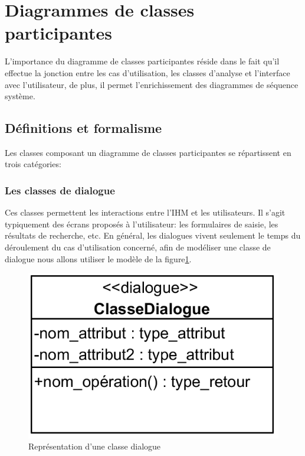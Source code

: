 \section{Diagrammes de classes participantes}
L’importance du diagramme de classes participantes réside dans le fait qu’il
effectue la jonction entre les cas d’utilisation, les classes d’analyse et
l’interface avec l’utilisateur, de plus, il permet l’enrichissement des
diagrammes de séquence système.\cite{8}

\subsection{Définitions et formalisme}
Les classes composant un diagramme de classes participantes se répartissent en
trois catégories:\cite{6}

\subsubsection{Les classes de dialogue}
Ces classes permettent les interactions entre l’IHM et les utilisateurs. 
Il s’agit typiquement des écrans proposés à l’utilisateur: les formulaires de 
saisie, les résultats de recherche, etc. En général, les dialogues vivent 
seulement le temps du déroulement du cas d’utilisation concerné, afin de 
modéliser une classe de dialogue nous allons utiliser le modèle de la 
figure\ref{fig20}.

\begin{figure}[h!]
    \centering
    \includegraphics[scale=1.5]{images/dialogue.png}
    \caption{Représentation d'une classe dialogue}
    \label{fig20}
\end{figure}
        
